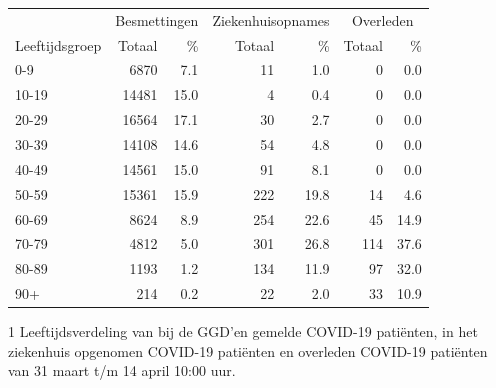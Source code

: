 \documentclass[
  english,
  man,floatsintext]{apa6}
\begin{document}
\begin{table}
\centering\begingroup\fontsize{11}{13}\selectfont

\begin{threeparttable}
\begin{tabular}{lrrrrrr}
\toprule
\multicolumn{1}{c}{ } & \multicolumn{2}{c}{Besmettingen} & \multicolumn{2}{c}{Ziekenhuisopnames} & \multicolumn{2}{c}{Overleden} \\
\cmidrule(l{3pt}r{3pt}){2-3} \cmidrule(l{3pt}r{3pt}){4-5} \cmidrule(l{3pt}r{3pt}){6-7}
Leeftijdsgroep & Totaal & \% & Totaal & \% & Totaal & \%\\
\midrule
0-9 & 6870 & 7.1 & 11 & 1.0 & 0 & 0.0\\
10-19 & 14481 & 15.0 & 4 & 0.4 & 0 & 0.0\\
20-29 & 16564 & 17.1 & 30 & 2.7 & 0 & 0.0\\
30-39 & 14108 & 14.6 & 54 & 4.8 & 0 & 0.0\\
40-49 & 14561 & 15.0 & 91 & 8.1 & 0 & 0.0\\
50-59 & 15361 & 15.9 & 222 & 19.8 & 14 & 4.6\\
60-69 & 8624 & 8.9 & 254 & 22.6 & 45 & 14.9\\
70-79 & 4812 & 5.0 & 301 & 26.8 & 114 & 37.6\\
80-89 & 1193 & 1.2 & 134 & 11.9 & 97 & 32.0\\
90+ & 214 & 0.2 & 22 & 2.0 & 33 & 10.9\\
\bottomrule
\end{tabular}
\begin{tablenotes}
\item[1] Leeftijdsverdeling van bij de GGD’en gemelde COVID-19 patiënten, in het ziekenhuis opgenomen COVID-19 patiënten en overleden COVID-19 patiënten van 31 maart t/m 14 april 10:00 uur.
\end{tablenotes}
\end{threeparttable}
\endgroup{}
\end{table}

\newpage
\end{document}
